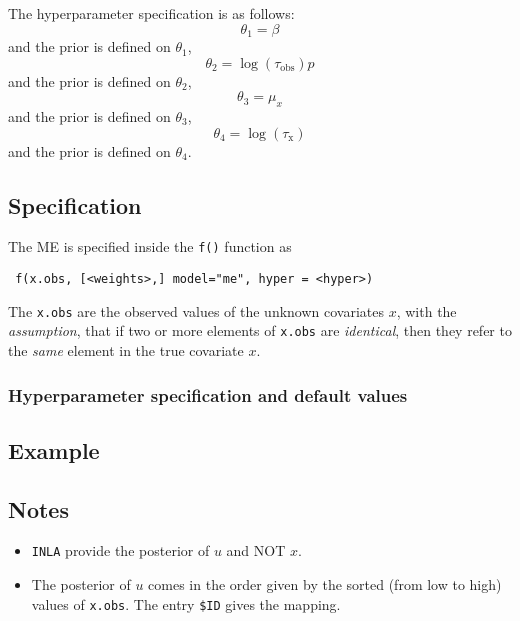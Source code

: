 \documentclass[a4paper,11pt]{article}
\begin{document}
The hyperparameter specification is as follows:
\begin{displaymath}
    \theta_{1} = \beta
\end{displaymath}
and the prior is defined on $\theta_{1}$,
\begin{displaymath}
    \theta_{2} = \log(\tau_{\text{obs}})
p\end{displaymath}
and the prior is defined on $\theta_{2}$,
\begin{displaymath}
    \theta_{3} = \mu_{x}
\end{displaymath}
and the prior is defined on $\theta_{3}$,
\begin{displaymath}
    \theta_{4} = \log(\tau_{\text{x}})
\end{displaymath}
and the prior is defined on $\theta_{4}$.


\subsection*{Specification}

The ME is specified inside the {\tt f()}
function as
\begin{verbatim}
 f(x.obs, [<weights>,] model="me", hyper = <hyper>)
\end{verbatim}
The \texttt{x.obs} are the observed values of the unknown covariates
$x$, with the \emph{assumption}, that if two or more elements of
\texttt{x.obs} are \emph{identical}, then they refer to the
\emph{same} element in the true covariate $x$.

\subsubsection*{Hyperparameter specification and default values}


\subsection*{Example}



\subsection*{Notes}

\begin{itemize}
\item \texttt{INLA} provide the posterior of $u$ and NOT $x$.
\item The posterior of $u$ comes in the order given by the sorted
    (from low to high) values of \texttt{x.obs}. The entry \verb|$ID|
    gives the mapping.
\end{itemize}
\end{document}
